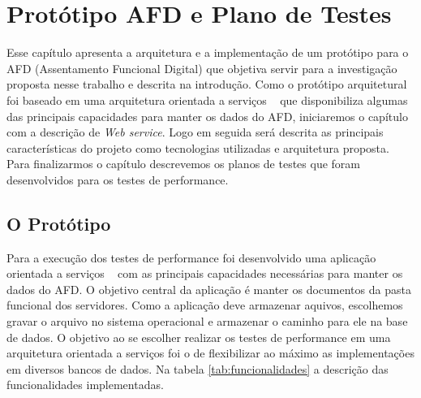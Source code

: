 \chapter{Protótipo AFD e Plano de Testes}

Esse capítulo apresenta a arquitetura e a implementação de um protótipo para o AFD (Assentamento Funcional Digital) que objetiva servir para a investigação proposta nesse trabalho e descrita na introdução. Como o protótipo arquitetural foi baseado em uma arquitetura orientada a serviços ~\cite{erl:2007} que disponibiliza algumas das principais capacidades para manter os dados do AFD, iniciaremos o capítulo com a descrição de \textit{Web service}. Logo em seguida será descrita as principais características do projeto como tecnologias utilizadas e arquitetura proposta. Para finalizarmos o capítulo descrevemos os planos de testes que foram desenvolvidos para os testes de performance.



\section{O Protótipo}

Para a execução dos testes de performance foi desenvolvido uma aplicação orientada a serviços ~\cite{erl:2007} com as principais capacidades necessárias para manter os dados do AFD. O objetivo central da aplicação é manter os documentos da pasta funcional dos servidores. Como a aplicação deve armazenar aquivos, escolhemos gravar o arquivo no sistema operacional e armazenar o caminho para ele na base de dados. O objetivo ao se escolher realizar os testes de performance em uma arquitetura orientada a serviços foi o de flexibilizar ao máximo as implementações em diversos bancos de dados. Na tabela \ref{tab:funcionalidades} a descrição das funcionalidades implementadas.

\renewcommand{\arraystretch}{3}

